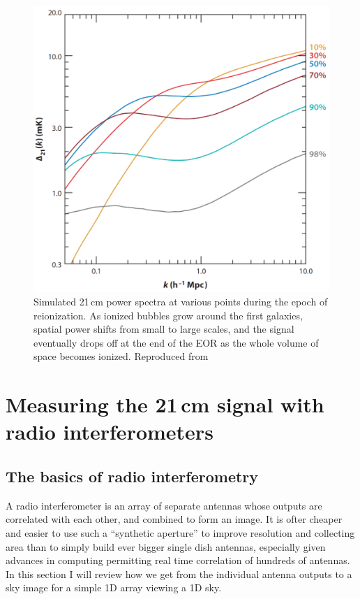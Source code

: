 \begin{figure}
	\centering
	\includegraphics[width=4.5in]{chap0_intro/FiducialPS.png}
	\caption[Simulated 21\,cm power spectra at various points during the epoch of reionization.]{Simulated 21\,cm power spectra at various points during the epoch of reionization. As ionized bubbles grow around the first galaxies, spatial power shifts from small to large scales, and the signal eventually drops off at the end of the EOR as the whole volume of space becomes ionized. Reproduced from \citet{BarkanaPS2009}}
	\label{fig:fiducialPS}
\end{figure}

\section{Measuring the 21\,cm signal with radio interferometers}

\subsection{The basics of radio interferometry}

A radio interferometer is an array of separate antennas whose outputs are correlated with each other, and combined to form an image. It is ofter cheaper and easier to use such a ``synthetic aperture'' to improve resolution and collecting area than to simply build ever bigger single dish antennas, especially given advances in computing permitting real time correlation of hundreds of antennas. In this section I will review how we get from the individual antenna outputs to a sky image for a simple 1D array viewing a 1D sky.

